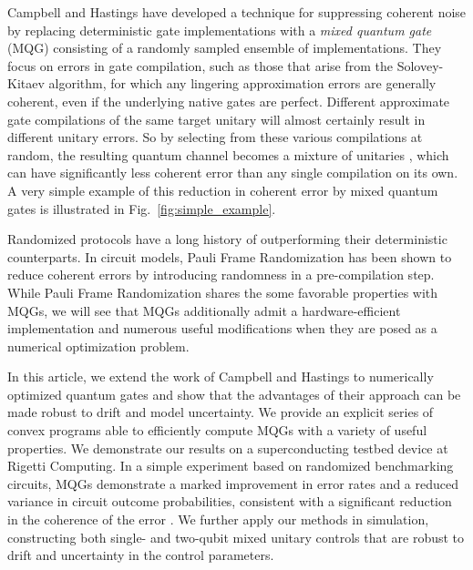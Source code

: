 \documentclass[aps,nofootinbib,pra,notitlepage,twocolumn]{revtex4-1}
\newcommand{\0}{\ensuremath{\mathbf{0}}}
\begin{document}
Campbell \cite{Campbell2017,Campbell2019} and Hastings \cite{Hastings2017} have developed a technique for suppressing coherent noise by replacing deterministic gate implementations with a \emph{mixed quantum gate} (MQG) consisting of a randomly sampled ensemble of implementations. They focus on errors in gate compilation, such as those that arise from the Solovey-Kitaev algorithm, for which any lingering approximation errors are generally coherent, even if the underlying native gates are perfect. Different approximate gate compilations of the same target unitary will almost certainly result in different unitary errors. So by selecting from these various compilations at random, the resulting quantum channel becomes a mixture of unitaries \cite{DBLP:journals/corr/cs-CC-0012017}, which can have significantly less coherent error than any single compilation on its own. A very simple example of this reduction in coherent error by mixed quantum gates is illustrated in Fig.~\ref{fig:simple_example}. 

Randomized protocols have a long history of outperforming their deterministic counterparts\cite{Viola2005, Santos2006}. In circuit models, Pauli Frame Randomization \cite{Wallman2016, 1803.01818, dahlen2018experimental} has been shown to reduce coherent errors by introducing randomness in a pre-compilation step. While Pauli Frame Randomization shares the some favorable properties with MQGs, we will see that MQGs additionally admit a hardware-efficient implementation and numerous useful modifications when they are posed as a numerical optimization problem.

In this article, we extend the work of Campbell and Hastings to numerically optimized quantum gates and show that the advantages of their approach can be made robust to drift and model uncertainty. We provide an explicit series of convex programs able to efficiently compute MQGs with a variety of useful properties. We demonstrate our results on a superconducting testbed device at Rigetti Computing.  In a simple experiment based on randomized benchmarking circuits, MQGs demonstrate a marked improvement in error rates and a reduced variance in circuit outcome probabilities, consistent with a significant reduction in the coherence of the error \cite{Ball2016}. We further apply our methods in simulation, constructing both single- and two-qubit mixed unitary controls that are robust to drift and uncertainty in the control parameters.


\end{document}
